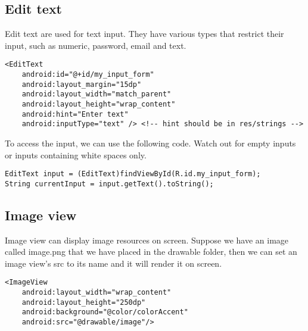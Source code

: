 \subsection{Edit text}
Edit text are used for text input. They have various types that restrict their input, such as numeric, password, email and text. 
\begin{lstlisting}[style=A_XML, caption={Edit text declaration}, label = {listing:edittext}]
<EditText
    android:id="@+id/my_input_form"
    android:layout_margin="15dp"
    android:layout_width="match_parent"
    android:layout_height="wrap_content"
    android:hint="Enter text"
    android:inputType="text" /> <!-- hint should be in res/strings -->
\end{lstlisting}
To access the input, we can use the following code. Watch out for empty inputs or inputs containing white spaces only.
\begin{lstlisting}[style=A_Java]
EditText input = (EditText)findViewById(R.id.my_input_form);
String currentInput = input.getText().toString();
\end{lstlisting}

\subsection{Image view}
Image view can display image resources on screen. Suppose we have an image called image.png that we have placed in the drawable folder, then we can set an image view's src to its name and it will render it on screen.
\begin{lstlisting}[style=A_XML, caption={Image view declaration}, label={listing:img}]
<ImageView
    android:layout_width="wrap_content"
    android:layout_height="250dp"
    android:background="@color/colorAccent"
    android:src="@drawable/image"/>
\end{lstlisting}

